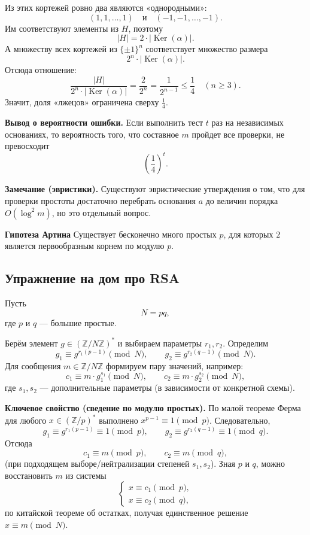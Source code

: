 \documentclass[12pt,a4paper]{article}
\newcommand{\Z}{\mathbb{Z}}
\DeclareMathOperator{\Ker}{Ker}
\begin{document}
Из этих кортежей ровно два являются «однородными»:
\[
(1,1,\dots,1)\quad\text{и}\quad(-1,-1,\dots,-1).
\]
Им соответствуют элементы из $H$, поэтому
\[
|H|=2\cdot |\Ker(\alpha)|.
\]
А множеству всех кортежей из $\{\pm 1\}^n$ соответствует множество размера
\[
2^{n}\cdot |\Ker(\alpha)|.
\]
Отсюда отношение:
\[
\frac{|H|}{2^{n}\cdot |\Ker(\alpha)|}=\frac{2}{2^{n}}=\frac{1}{2^{n-1}}\le \frac14\quad (n\ge 3).
\]
Значит, доля «лжецов» ограничена сверху $\frac14$.

\textbf{Вывод о вероятности ошибки.}
Если выполнить тест $t$ раз на независимых основаниях, то вероятность того, что составное $m$ пройдет все проверки, не превосходит
\[
\left(\frac14\right)^{t}.
\]

\textbf{Замечание (эвристики).}
Существуют эвристические утверждения о том, что для проверки простоты достаточно перебрать основания $a$ до величин порядка $O(\log^2 m)$, но это отдельный вопрос.

\textbf{Гипотеза Артина}
Существует бесконечно много простых $p$, для которых $2$ является первообразным корнем по модулю $p$.

\subsection*{Упражнение на дом про RSA}

Пусть
\[
N=pq,
\]
где $p$ и $q$ — большие простые.

Берём элемент $g\in(\Z/N\Z)^{\ast}$ и выбираем параметры $r_1,r_2$.
Определим
\[
g_1 \equiv g^{r_1(p-1)}\pmod N,
\qquad
g_2 \equiv g^{r_2(q-1)}\pmod N.
\]
Для сообщения $m\in\Z/N\Z$ формируем пару значений, например:
\[
c_1 \equiv m\cdot g_1^{s_1}\pmod N,
\qquad
c_2 \equiv m\cdot g_2^{s_2}\pmod N,
\]
где $s_1,s_2$ — дополнительные параметры (в зависимости от конкретной схемы).

\textbf{Ключевое свойство (сведение по модулю простых).}
По малой теореме Ферма для любого $x\in(\Z/p)^{\ast}$ выполнено $x^{p-1}\equiv 1\pmod p$.
Следовательно,
\[
g_1 \equiv g^{r_1(p-1)}\equiv 1\pmod p,
\qquad
g_2 \equiv g^{r_2(q-1)}\equiv 1\pmod q.
\]
Отсюда
\[
c_1 \equiv m\pmod p,
\qquad
c_2 \equiv m\pmod q,
\]
(при подходящем выборе/нейтрализации степеней $s_1,s_2$).
Зная $p$ и $q$, можно восстановить $m$ из системы
\[
\begin{cases}
x\equiv c_1\pmod p,\\
x\equiv c_2\pmod q,
\end{cases}
\]
по китайской теореме об остатках, получая единственное решение $x\equiv m\pmod N$.
\end{document}
